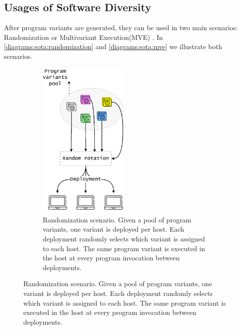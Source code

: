 
\subsection*{Usages of Software Diversity}

After program variants are generated, they can be used in two main scenarios: Randomization or Multivariant Execution(MVE) \cite{jackson}. In \autoref{diagrams:sota:randomization} and \autoref{diagrams:sota:mve} we illustrate both scenarios. 



\newcommand{\rulesep}{\unskip\ \vrule\ }
\begin{figure}[h]
    \centering
    \begin{subfigure}[t]{0.45\textwidth}
        \centering
        \includegraphics[height=3.1in]{diagrams/randomization.pdf}
        \vspace{0.5cm}
        \caption{Randomization scenario. Given a pool of program variants, one variant is deployed per host. Each deployment randomly selects which variant is assigned to each host. The same program variant is executed in the host at every program invocation between deployments. }        \label{diagrams:sota:randomization}


\end{subfigure}
\end{figure}
